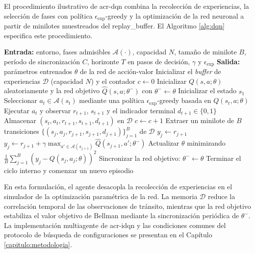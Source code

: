 El procedimiento ilustrativo de \acrshort{acr-dqn} combina la recolección de experiencias, la selección de fases con política $\epsilon_{\mathrm{exp}}$-greedy y la optimización de la red neuronal a partir de minilotes muestreados del \gls{replay_buffer}. El Algoritmo \ref{alg:dqn} especifica este procedimiento.

\begin{algorithm}[!htb]
\caption{Deep Q-Network con repetición de experiencias}
\label{alg:dqn}
\begin{algorithmic}[1]
\Statex \textbf{Entrada:} entorno, fases admisibles $\mathcal{A}(\cdot)$, capacidad $N$, tamaño de minilote $B$, período de sincronización $C$, horizonte $T$ en pasos de decisión, $\gamma$ y $\epsilon_{\mathrm{exp}}$
\Statex \textbf{Salida:} parámetros entrenados $\theta$ de la red de acción-valor
\State Inicializar el \textit{buffer} de experiencias $\mathcal{D}$ (capacidad $N$) y el contador $c \leftarrow 0$
\State Inicializar $Q(s,a;\theta)$ aleatoriamente y la red objetivo $\hat{Q}(s,a;\theta^-)$ con $\theta^- \leftarrow \theta$
    \State Inicializar el estado $s_1$
        \State Seleccionar $a_t \in \mathcal{A}(s_t)$ mediante una política $\epsilon_{\mathrm{exp}}$-greedy basada en $Q(s_t,a;\theta)$
        \State Ejecutar $a_t$ y observar $r_{t+1}$, $s_{t+1}$ y el indicador terminal $d_{t+1} \in \{0, 1\}$
        \State Almacenar $(s_t,a_t,r_{t+1},s_{t+1},d_{t+1})$ en $\mathcal{D}$
        \State $c \leftarrow c + 1$
            \State Extraer un minilote de $B$ transiciones $\{(s_j,a_j,r_{j+1},s_{j+1},d_{j+1})\}_{j=1}^{B}$ de $\mathcal{D}$
                    \State $y_j \leftarrow r_{j+1}$
                \Else
                    \State $y_j \leftarrow r_{j+1} + \gamma \max_{a' \in \mathcal{A}(s_{j+1})} \hat{Q}(s_{j+1},a';\theta^-)$
                \EndIf
            \EndFor
            \State Actualizar $\theta$ minimizando $\frac{1}{B}\sum_{j=1}^{B}\left(y_j-Q(s_j,a_j;\theta)\right)^2$
        \EndIf
            \State Sincronizar la red objetivo: $\theta^- \leftarrow \theta$
        \EndIf
            \State Terminar el ciclo interno y comenzar un nuevo episodio
        \EndIf
    \EndFor
\EndFor
\end{algorithmic}
\end{algorithm}
\FloatBarrier

\begingroup
{}
En esta formulación, el agente desacopla la recolección de experiencias en el simulador de la optimización paramétrica de la red. La memoria $\mathcal{D}$ reduce la correlación temporal de las observaciones de tránsito, mientras que la red objetivo estabiliza el valor objetivo de Bellman mediante la sincronización periódica de $\theta^-$. La implementación multiagente de \acrshort{acr-idqn} y las condiciones comunes del protocolo de búsqueda de configuraciones se presentan en el Capítulo \ref{capitulo:metodologia}.
\par
\endgroup

